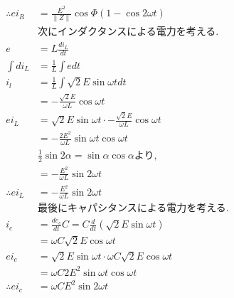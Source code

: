 \documentclass[twocolumn]{article}
\begin{document}
\begin{enumerate}
\begin{align*}
          \therefore ei_R & = \frac{E^2}{\|Z\|}\cos \Phi\left(1 - \cos 2 \omega t\right)                            \\
          &\text{次にインダクタンスによる電力を考える.}\\
          e &= L\frac{di_L}{dt}\\
          \int di_L &= \frac{1}{L} \int edt\\
          i_l &= \frac{1}{L}\int \sqrt{2}E\sin\omega t dt\\
              &= -\frac{\sqrt{2}E}{\omega L}\cos \omega t\\
          ei_L  &= \sqrt{2}E\sin\omega t \cdot -\frac{\sqrt{2}E}{\omega L}\cos \omega t\\
                &= -\frac{2E^2}{\omega L}\sin\omega t \cos \omega t\\
          &\frac{1}{2} \sin 2\alpha = \sin\alpha\cos\alpha\text{より,}\\
                &= -\frac{E^2}{\omega L}\sin 2\omega t\\
                \therefore ei_L &= -\frac{E^2}{\omega L}\sin 2\omega t\\
          &\text{最後にキャパシタンスによる電力を考える.}\\
          i_c &= \frac{de_c}{dt}C = C \frac{d}{dt}\left(\sqrt{2}E\sin\omega t\right)\\
              &= \omega C \sqrt{2}E\cos\omega t\\
          ei_c  &= \sqrt{2}E\sin \omega t \cdot \omega C \sqrt{2}E \cos \omega t\\
                &= \omega C 2 E^2 \sin \omega t \cos \omega t\\
\therefore ei_c      &= \omega C E^2 \sin 2\omega t\\
        \end{align*}


\end{enumerate}
\end{document}
